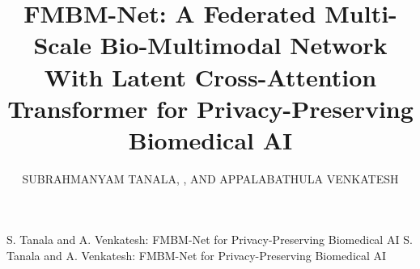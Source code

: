 \documentclass{ieeeaccess}
\begin{document}
\setlength{\intextsep}{10pt}
\setlength{\textfloatsep}{12pt}
\setlength{\floatsep}{10pt}


\title{FMBM-Net: A Federated Multi-Scale Bio-Multimodal Network With
Latent Cross-Attention Transformer for Privacy-Preserving Biomedical AI}

\author{
  \uppercase{Subrahmanyam Tanala},
  ,
  AND
  \uppercase{Appalabathula Venkatesh}}

\address[1]{Department of Electrical and Electronics Engineering,
  Anil Neerukonda Institute of Technology and Sciences (ANITS),
  Visakhapatnam 531162, Andhra Pradesh, India
  (e-mail: tanala.subrahmanyam@anits.edu.in)}

\address[2]{Department of Electrical and Electronics Engineering,
  Anil Neerukonda Institute of Technology and Sciences (ANITS),
  Visakhapatnam 531162, Andhra Pradesh, India
  (e-mail: venkatesh15793@gmail.com)}


\markboth
{S. Tanala and A. Venkatesh: FMBM-Net for Privacy-Preserving Biomedical AI}
{S. Tanala and A. Venkatesh: FMBM-Net for Privacy-Preserving Biomedical AI}

\end{document}
